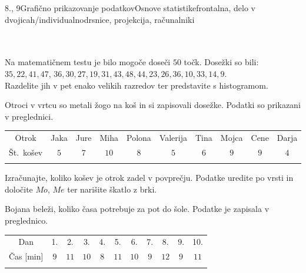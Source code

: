 \begin{priprava}{8., 9}{}{Grafično prikazovanje podatkov}{Osnove statistike}{frontalna, delo v dvojicah/individualno}{drsnice, projekcija, računalniki}
~\\~\\~






    \begin{naloga}
 
        Na matematičnem testu je bilo mogoče doseči $50$ točk. Dosežki so bili: 
        $35, 22, 41, 47$, $36, 30, 27, 19, 31, 43, 48, 44, 23, 26, 36, 10, 33, 14, 9$. \\
        Razdelite jih v pet enako velikih razredov ter predstavite s histogramom.
        
    \end{naloga}


    \begin{naloga}
     
     Otroci v vrtcu so metali žogo na koš in si zapisovali dosežke. Podatki so prikazani v preglednici. 

         \begin{table}[H]
             \centering
             \begin{tabular}{||c|c|c|c|c|c|c|c|c|c||} 
             \hhline{|t:==========:t|}
             \rowcolor[rgb]{0.843,0.718,0.718} 
             Otrok  & Jaka & Jure & Miha & Polona & Valerija & Tina & Mojca & Cene & Darja   \\ 
             \hhline{|:==========:|}
             Št.~košev & $5$ & $7$ & $10$ & $8$ & $5$ & $6$ & $9$ & $9$& $4$  \\ 
             \hhline{|b:==========:b|}
             \end{tabular}
         \end{table}

         Izračunajte, koliko košev je otrok zadel v povprečju. Podatke uredite po vrsti in določite $Mo$, $Me$ ter narišite škatlo z brki.

    \end{naloga}





\begin{naloga}
 
    Bojana beleži, koliko časa potrebuje za pot do šole. Podatke je zapisala v preglednico. 

     \begin{table}[H]
         \centering
         \begin{tabular}{||c|c|c|c|c|c|c|c|c|c|c||} 
         \hhline{|t:===========:t|}
         \rowcolor[rgb]{0.843,0.718,0.718} 
         Dan  & 1. & 2. & 3. & 4. & 5. & 6. & 7. & 8. & 9. & 10.   \\ 
         \hhline{|:===========:|}
         Čas [min] & $9$ & $11$ & $10$ & $8$ & $11$ & $10$ & $9$ & $12$& $9$ & $11$ \\ 
         \hhline{|b:===========:b|}
         \end{tabular}
     \end{table}


\end{naloga}
\end{priprava}
